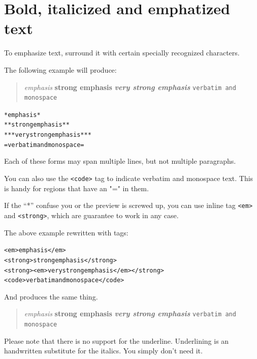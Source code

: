 \documentclass[DIV=12,%
               BCOR=0mm,%
               fontsize=10pt,%
               oneside,%
               paper=210mm:11in]{scrbook}
\begin{document}
\chapter{Bold, italicized and emphatized text}


To emphasize text, surround it with certain specially recognized
characters.


The following example will produce:



\begin{quote}


\emph{emphasis}
\textbf{strong emphasis}
\textbf{\emph{very strong emphasis}}
\texttt{verbatim and monospace}



\end{quote}


\begin{alltt}
     *emphasis*
     **strong emphasis**
     ***very strong emphasis***
     =verbatim and monospace=

\end{alltt}


Each of these forms may span
multiple lines, but not multiple paragraphs.


You can also use the \texttt{<code>} tag to indicate verbatim and monospace
text. This is handy for regions that have an "=" in them.


If the “*” confuse you or the preview is screwed up, you can use
inline tag \texttt{<em>} and \texttt{<strong>}, which are guarantee to work in any case.


The above example rewritten with tags:


\begin{alltt}
     <em>emphasis</em>
     <strong>strong emphasis</strong>
     <strong><em>very strong emphasis</em></strong>
     <code>verbatim and monospace</code>

\end{alltt}


And produces the same thing.



\begin{quote}


\emph{emphasis}
\textbf{strong emphasis}
\textbf{\emph{very strong emphasis}}
\texttt{verbatim and monospace}



\end{quote}


Please note that there is no support for the underline. Underlining is
an handwritten substitute for the italics. You simply don't need it.
\end{document}
